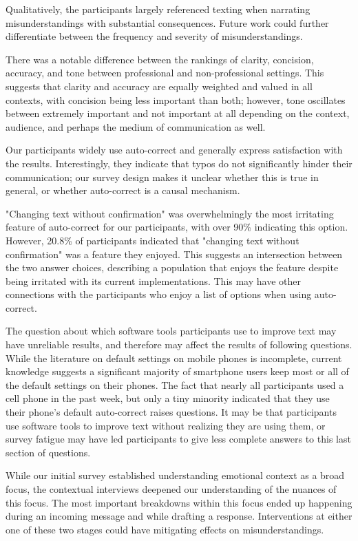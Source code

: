 \documentclass[acmsmall,screen,authorversion,nonacm]{acmart}
\begin{document}
Qualitatively, the participants largely referenced texting when narrating misunderstandings with substantial consequences. Future work could further differentiate between the frequency and severity of misunderstandings. 

There was a notable difference between the rankings of clarity, concision, accuracy, and tone between professional and non-professional settings. This suggests that clarity and accuracy are equally weighted and valued in all contexts, with concision being less important than both; however, tone oscillates between extremely important and not important at all depending on the context, audience, and perhaps the medium of communication as well.

Our participants widely use auto-correct and generally express satisfaction with the results. Interestingly, they indicate that typos do not significantly hinder their communication; our survey design makes it unclear whether this is true in general, or whether auto-correct is a causal mechanism.

"Changing text without confirmation" was overwhelmingly the most irritating feature of auto-correct for our participants, with over 90\% indicating this option. However, 20.8\% of participants indicated that "changing text without confirmation" was a feature they enjoyed. This suggests an intersection between the two answer choices, describing a population that enjoys the feature despite being irritated with its current implementations. This may have other connections with the participants who enjoy a list of options when using auto-correct.

The question about which software tools participants use to improve text may have unreliable results, and therefore may affect the results of following questions. While the literature on default settings on mobile phones is incomplete, current knowledge suggests a significant majority of smartphone users keep most or all of the default settings on their phones. The fact that nearly all participants used a cell phone in the past week, but only a tiny minority indicated that they use their phone's default auto-correct raises questions. It may be that participants use software tools to improve text without realizing they are using them, or survey fatigue may have led participants to give less complete answers to this last section of questions.

While our initial survey established understanding emotional context as a broad focus, the contextual interviews deepened our understanding of the nuances of this focus. The most important breakdowns within this focus ended up happening during an incoming message and while drafting a response. Interventions at either one of these two stages could have mitigating effects on misunderstandings.
\end{document}
